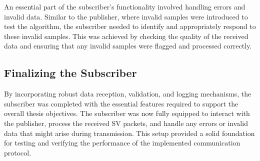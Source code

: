 An essential part of the subscriber’s functionality involved handling errors and invalid data. Similar to the publisher, where invalid samples were introduced to test the algorithm, the subscriber needed to identify and appropriately respond to these invalid samples. This was achieved by checking the quality of the received data and ensuring that any invalid samples were flagged and processed correctly.

\subsection{Finalizing the Subscriber}

By incorporating robust data reception, validation, and logging mechanisms, the subscriber was completed with the essential features required to support the overall thesis objectives. The subscriber was now fully equipped to interact with the publisher, process the received SV packets, and handle any errors or invalid data that might arise during transmission. This setup provided a solid foundation for testing and verifying the performance of the implemented communication protocol.
